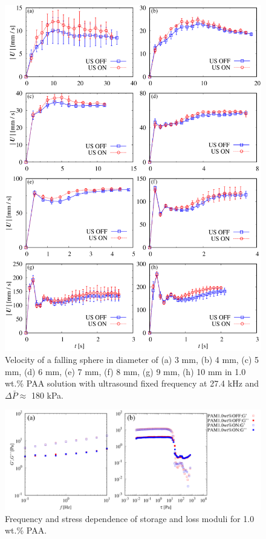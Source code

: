 \begin{figure}[ht]
    \begin{center}
        \includegraphics[width=13cm,clip]{5-Discussion/iwamuro-fall.png}
    \caption{Velocity of a falling sphere in diameter of (a) 3 mm, (b) 4 mm, (c) 5 mm, (d) 6 mm, (e) 7 mm, (f) 8 mm, (g) 9 mm, (h) 10 mm in 1.0 wt.\% PAA solution with ultrasound fixed frequency at 27.4 kHz and $\Delta \bar{P} \approx$ 180 kPa\cite{ref:8}.}
    \label{fig:iwamuro-fall}
    \end{center}
\end{figure}

\begin{figure}[ht]
    \includegraphics[width=15cm,clip]{5-Discussion/iwamuro-G.PNG}
    \caption{Frequency and stress dependence of storage and loss moduli for 1.0 wt.\% PAA.\cite{ref:8}}
    \label{fig:iwamuro-G}
\end{figure}

